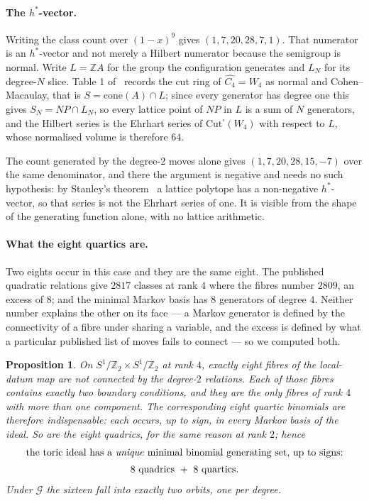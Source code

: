 \documentclass[11pt,a4paper]{article}
\newtheorem{proposition}{Proposition}
\theoremstyle{definition}
\newcommand{\ZZ}{\mathbb{Z}}
\begin{document}
\paragraph{The $h^*$-vector.} Writing the class count over $(1-x)^9$ gives $(1,7,20,28,7,1)$. That
numerator is an $h^*$-vector and not merely a Hilbert numerator because the semigroup is normal.
Write $L=\ZZ A$ for the group the configuration generates and $L_N$ for its degree-$N$ slice.
Table 1 of~\cite{SScuts} records the cut ring of $\widehat{C_4}=W_4$ as normal and Cohen--Macaulay,
that is $S=\mathrm{cone}(A)\cap L$; since every generator has degree one this gives
$S_N=NP\cap L_N$, so every lattice point of $NP$ in $L$ is a sum of $N$ generators, and the
Hilbert series is the Ehrhart series of $\mathrm{Cut}^\square(W_4)$ with respect to $L$, whose
normalised volume is therefore $64$.

The count generated by the degree-$2$ moves alone gives $(1,7,20,28,15,-7)$ over the same
denominator, and there the argument is negative and needs no such hypothesis: by Stanley's
theorem~\cite{Stanley} a lattice polytope has a non-negative $h^*$-vector, so that series is not the
Ehrhart series of one. It is visible from the shape of the generating function alone, with no
lattice arithmetic.

\paragraph{What the eight quartics are.} Two eights occur in this case and they are the same eight.
The published quadratic relations give $2817$ classes at rank $4$ where the fibres number $2809$, an
excess of $8$; and the minimal Markov basis has $8$ generators of degree $4$. Neither number
explains the other on its face --- a Markov generator is defined by the connectivity of a fibre
under sharing a variable, and the excess is defined by what a particular published list of moves
fails to connect --- so we computed both.

\begin{proposition}\label{prop:eight}
On $S^1/\ZZ_2\times S^1/\ZZ_2$ at rank $4$, exactly eight fibres of the local-datum map are not
connected by the degree-$2$ relations. Each of those fibres contains exactly \emph{two} boundary
conditions, and they are the only fibres of rank $4$ with more than one component. The
corresponding eight quartic binomials are therefore \emph{indispensable}: each occurs, up to
sign, in every Markov basis of the ideal. So are the eight quadrics, for the same reason at rank
$2$; hence
\[
\begin{gathered}
\text{the toric ideal has a \emph{unique} minimal binomial generating set, up to signs:}\\[2pt]
8\ \text{quadrics}\ +\ 8\ \text{quartics.}
\end{gathered}
\]
Under $\mathcal G$ the sixteen fall into exactly two orbits, one per degree.
\end{proposition}
\end{document}
